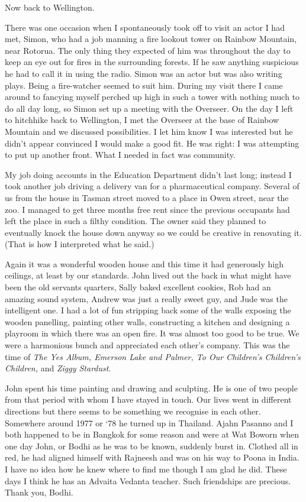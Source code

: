 Now back to Wellington.

There was one occasion when I spontaneously took off to visit an actor I
had met, Simon, who had a job manning a fire lookout tower on
Rainbow Mountain\cite{rainbow-mountain}, near Rotorua. The only thing they expected of him
was throughout the day to keep an eye out for fires in the surrounding
forests. If he saw anything suspicious he had to call it in using the
radio. Simon was an actor but was also writing plays. Being a
fire-watcher seemed to suit him. During my visit there I came around to
fancying myself perched up high in such a tower with nothing much to do
all day long, so Simon set up a meeting with the Overseer. On the day I
left to hitchhike back to Wellington, I met the Overseer at the base of
Rainbow Mountain and we discussed possibilities. I let him know I was
interested but he didn't appear convinced I would make a good fit. He
was right: I was attempting to put up another front. What I needed in
fact was community.

My job doing accounts in the Education Department didn't last long;
instead I took another job driving a delivery van for a pharmaceutical
company. Several of us from the house in Tasman street moved to a place
in Owen street, near the zoo. I managed to get three months free rent
since the previous occupants had left the place in such a filthy
condition. The owner said they planned to eventually knock the house
down anyway so we could be creative in renovating it. (That is how I
interpreted what he said.)

Again it was a wonderful wooden house and this time it had generously
high ceilings, at least by our standards. John lived out the back in
what might have been the old servants quarters, Sally baked excellent
cookies, Rob had an amazing sound system, Andrew was just a really sweet
guy, and Jude was the intelligent one. I had a lot of fun stripping back
some of the walls exposing the wooden panelling, painting other walls,
constructing a kitchen and designing a playroom in which there was an
open fire. It was almost too good to be true. We were a harmonious bunch
and appreciated each other's company. This was the time of \emph{The Yes
Album, Emerson Lake and Palmer, To Our Children's Children's Children,}
and \emph{Ziggy Stardust}.

John spent his time painting and drawing and sculpting. He is one of two
people from that period with whom I have stayed in touch. Our lives went
in different directions but there seems to be something we recognise in
each other. Somewhere around 1977 or `78 he turned up in Thailand. Ajahn
Pasanno and I both happened to be in Bangkok for some reason and were at
Wat Boworn when one day John, or Bodhi as he was to be known, suddenly
burst in. Clothed all in red, he had aligned himself with Rajneesh and
was on his way to Poona in India. I have no idea how he knew where to
find me though I am glad he did. These days I think he has an Advaita
Vedanta teacher. Such friendships are precious. Thank you, Bodhi.

